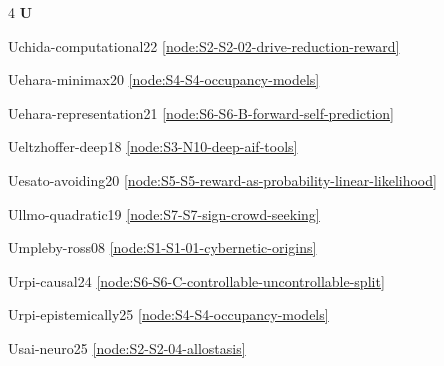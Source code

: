 \documentclass[10pt]{article}
\begin{document}
{\begin{multicols}{4}
\smallskip\textbf{U}\par
Uchida-computational22 \hfill \ref{node:S2-S2-02-drive-reduction-reward}\par
Uehara-minimax20 \hfill \ref{node:S4-S4-occupancy-models}\par
Uehara-representation21 \hfill \ref{node:S6-S6-B-forward-self-prediction}\par
Ueltzhoffer-deep18 \hfill \ref{node:S3-N10-deep-aif-tools}\par
Uesato-avoiding20 \hfill \ref{node:S5-S5-reward-as-probability-linear-likelihood}\par
Ullmo-quadratic19 \hfill \ref{node:S7-S7-sign-crowd-seeking}\par
Umpleby-ross08 \hfill \ref{node:S1-S1-01-cybernetic-origins}\par
Urpi-causal24 \hfill \ref{node:S6-S6-C-controllable-uncontrollable-split}\par
Urpi-epistemically25 \hfill \ref{node:S4-S4-occupancy-models}\par
Usai-neuro25 \hfill \ref{node:S2-S2-04-allostasis}\par


\end{multicols}}
\end{document}
